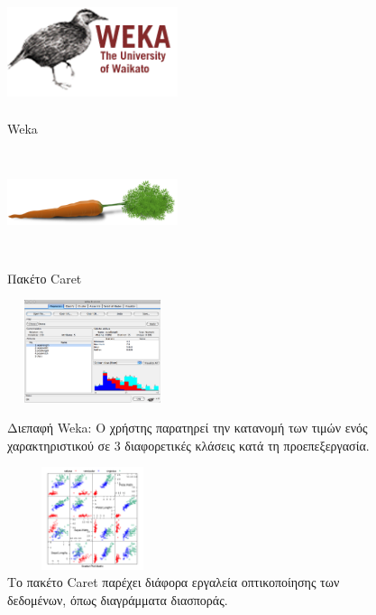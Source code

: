 \documentclass{article}
\begin{document}
\begin{figure}[H]
\begin{minipage}[c][11cm][t]{.5\textwidth}
  \vspace*{\fill}
  \centering
  \includegraphics[width=5cm,height=3cm]{weka_1.png}
  \caption[Weka]{Weka}
  \label{fig:test2}\par\vfill
  \includegraphics[width=5cm,height=3cm]{caret_1.png}
  \caption[Πακέτο Caret]{Πακέτο Caret}
  \label{fig:test3}
\end{minipage}
\begin{minipage}[c][11cm][t]{.5\textwidth}
  \vspace*{\fill}
  \centering
  \includegraphics[width=5cm,height=3cm]{weka_2.png}
  \caption[Διεπαφή Weka για προ επεξεργασία δεδομένων]{Διεπαφή Weka: Ο χρήστης παρατηρεί την κατανομή των τιμών ενός χαρακτηριστικού σε 3 διαφορετικές κλάσεις κατά τη προεπεξεργασία.}
  \label{fig:test2}\par\vfill
  \includegraphics[width=5cm,height=3cm]{caret_2.png}
  \caption[Οπτικοποιήση με το πακέτο Caret]{Το πακέτο Caret παρέχει διάφορα εργαλεία οπτικοποίησης των δεδομένων, όπως διαγράμματα διασποράς. }
  \label{fig:test3}
\end{minipage}

\end{figure}
\end{document}
